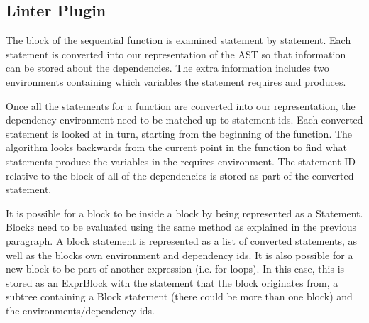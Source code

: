 \subsection{Linter Plugin}


The block of the sequential function is examined statement by statement. Each statement is converted into our representation of the AST so that information can be stored about the dependencies. The extra information includes two environments containing which variables the statement requires and produces.

Once all the statements for a function are converted into our representation, the dependency environment need to be matched up to statement ids. Each converted statement is looked at in turn, starting from the beginning of the function. The algorithm looks backwards from the current point in the function to find what statements produce the variables in the requires environment. The statement ID relative to the block of all of the dependencies is stored as part of the converted statement.

It is possible for a block to be inside a block by being represented as a Statement. Blocks need to be evaluated using the same method as explained in the previous paragraph. A block statement is represented as a list of converted statements, as well as the blocks own environment and dependency ids. It is also possible for a new block to be part of another expression (i.e. for loops). In this case, this is stored as an ExprBlock with the statement that the block originates from, a subtree containing a Block statement (there could be more than one block) and the environments/dependency ids.

